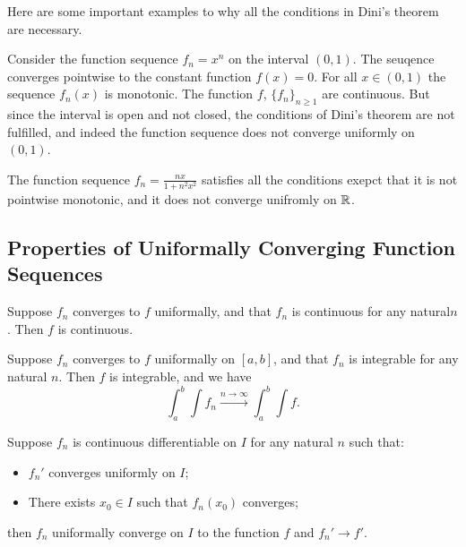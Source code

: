 \documentclass[11pt,a4paper]{article}
\begin{document}
  Here are some important examples to why all the conditions in Dini's theorem
  are necessary.

  \begin{example}
    Consider the function sequence $f_n = x^n$ on the interval $(0,1)$.
    The seuqence converges pointwise to the constant function $f(x) = 0$.
    For all $x \in (0,1)$ the sequence $f_n(x)$ is monotonic.
    The function $f$, $\{f_n\}_{n \geq 1}$ are continuous.
    But since the interval is open and not closed, the conditions of
    Dini's theorem are not fulfilled, and indeed the function sequence
    does not converge uniformly on $(0,1)$.
  \end{example}

  \begin{example}
    The function sequence $f_n = \frac{n x}{1 + n^2 x^2}$ satisfies all
    the conditions exepct that it is not pointwise monotonic, and it
    does not converge unifromly on $\mathbb{R}$.
  \end{example}

  \subsection{Properties of Uniformally Converging Function Sequences}
  \begin{proposition}
    Suppose $f_n$ converges to $f$ uniformally, and that $f_n$ is
    continuous for any natural$n$. Then $f$ is continuous.
  \end{proposition}


  \begin{proposition}
    Suppose $f_n$ converges to $f$ uniformally on $[a,b]$,
    and that $f_n$ is integrable for any natural $n$.
    Then $f$ is integrable, and we have
    \[
      \int_{a}^{b} \int f_n \xrightarrow{n \to \infty}
      \int_{a}^{b} \int f.
    \]
  \end{proposition}

  \begin{proposition}
    Suppose $f_n$ is continuous differentiable on $I$ for any natural $n$
    such that:
    \begin{itemize}
      \item  $f_n'$ converges  uniformly on $I$;
      \item There exists $x_0 \in I$ such that $f_n(x_0)$ converges;
    \end{itemize}
    then $f_n$ uniformally converge on $I$ to the function $f$ and
    $f_n'\to f'$.
  \end{proposition}
\end{document}
